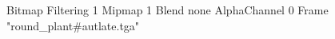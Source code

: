 {Bitmap
	{Filtering 1}
	{Mipmap 1}
	{Blend none}
	{AlphaChannel 0}
	{Frame "round_plant#autlate.tga"}
}

